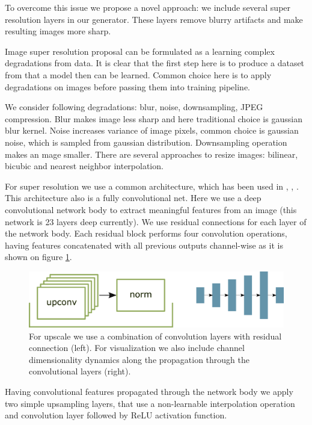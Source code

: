 To overcome this issue we propose a novel approach: we include several super resolution layers in our generator. These layers remove blurry artifacts and make resulting images more sharp.

Image super resolution proposal can be formulated as a learning complex degradations from data. It is clear that the first step here is to produce a dataset from that a model then can be learned. Common choice here is to apply degradations on images before passing them into training pipeline.

We consider following degradations: blur, noise, downsampling, JPEG compression. Blur makes image less sharp and here traditional choice is gaussian blur kernel. Noise increases variance of image pixels, common choice is gaussian noise, which is sampled from gaussian distribution. Downsampling operation makes an mage smaller. There are several approaches to resize images: bilinear, bicubic and nearest neighbor interpolation.

For super resolution we use a common architecture, which has been used in \cite{Ledig_Theis_Huszar_Caballero_Cunningham_Acosta_Aitken_Tejani_Totz_Wang_et_al_2017}, \cite{Wang_Yu_Wu_Gu_Liu_Dong_Qiao_Loy_2019}, \cite{Wang_Xie_Dong_Shan_2021}. This architecture also is a fully convolutional net. Here we use a deep convolutional network body to extract meaningful features from an image (this network is 23 layers deep currently). We use residual connections for each layer of the network body. Each residual block performs four convolution operations, having features concatenated with all previous outputs channel-wise as it is shown on figure \ref{upscale}.

\begin{figure}[!ht]
    \centering
    \includegraphics[width=\textwidth]{figure/upscale.png}
    \caption{For upscale we use a combination of convolution layers with residual connection (left). For visualization we also include channel dimensionality dynamics along the propagation through the convolutional layers (right).}
    \label{upscale}
\end{figure}

Having convolutional features propagated through the network body we apply two simple upsampling layers, that use a non-learnable interpolation operation and convolution layer followed by ReLU activation function.

